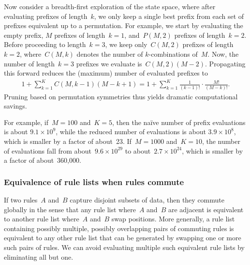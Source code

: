 Now consider a breadth-first exploration of the state space,
where after evaluating prefixes of length~$k$, we only keep a single best prefix
from each set of prefixes equivalent up to a permutation.
%
For example, we start by evaluating the empty prefix,
$M$ prefixes of length~${k=1}$, and~${P(M, 2)}$ prefixes of length~${k=2}$.
%
Before proceeding to length~${k=3}$, we keep only~${C(M, 2)}$ prefixes of length~${k=2}$,
where~${C(M, k)}$ denotes the number of $k$-combinations of~$M$.
%
Now, the number of length~${k=3}$ prefixes we evaluate is~${C(M, 2) (M - 2)}$.
%
Propagating this forward reduces the (maximum) number of evaluated prefixes to
\begin{align}
1 + \sum_{k=1}^K C(M, k-1) (M - k + 1)
= 1 + \sum_{k=1}^K \frac{1}{(k - 1)!} \cdot \frac{M!}{(M - k)!}.
\end{align}
Pruning based on permutation symmetries thus yields dramatic computational savings.

For example, if~${M = 100}$ and~${K = 5}$, then the na\"ive number of prefix evaluations is
about ${9.1 \times 10^9}$, while the reduced number of evaluations is about ${3.9 \times 10^8}$,
which is smaller by a factor of about~23.
%
If~${M=1000}$ and~${K = 10}$, the number of evaluations fall from
about~${9.6 \times 10^{29}}$ to about~${2.7 \times 10^{24}}$,
which is smaller by a factor of about~360,000.
%

\subsubsection{Equivalence of rule lists when rules commute}

If two rules~$A$ and~$B$ capture disjoint subsets of data,
then they commute globally in the sense that any rule list where~$A$ and~$B$ are
adjacent is equivalent to another rule list where~$A$ and~$B$ swap positions.
%
More generally, a rule list containing possibly multiple, possibly overlapping
pairs of commuting rules is equivalent to any other rule list that can be generated
by swapping one or more such pairs of rules.
%
We can avoid evaluating multiple such equivalent rule lists by eliminating all but one.
%

